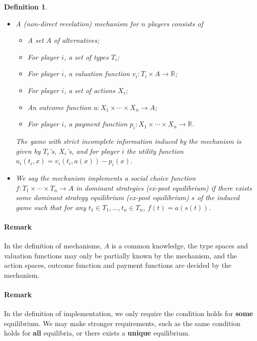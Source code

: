 \documentclass[openany]{book}
\newtheorem{definition}{Definition}[chapter]
\theoremstyle{remark}
\begin{document}
\begin{definition}$\ $
    \begin{itemize}
        \item A (non-direct revelation) mechanism for $n$ players consists of
        \begin{itemize}
            \item A set $A$ of alternatives;
            \item For player $i$, a set of types $T_i$;
            \item For player $i$, a valuation function $v_i:T_i\times A\to \mathbb{R}$;
            \item For player $i$, a set of actions $X_i$;
            \item An outcome function $a:X_1\times\cdots\times X_n\to A$;
            \item For player $i$, a payment function $p_i:X_1\times\cdots\times X_n\to \mathbb{R}$.
        \end{itemize}
        The game with strict incomplete information induced by the mechanism is given by $T_i$'s, $X_i$'s, and for player $i$ the utility function $u_i(t_i,x)=v_i(t_i,a(x))-p_i(x)$.
        \item We say the mechanism implements a social choice function $f:T_1\times\cdots\times T_n\to A$ in dominant strategies (ex-post equilibrium) if there exists some dominant strategy equilibrium (ex-post equilibrium) $s$ of the induced game such that for any $t_1\in T_1,\ldots,t_n\in T_n$, $f(t)=a(s(t))$.
    \end{itemize}
\end{definition}
\paragraph{Remark}
In the definition of mechanisms, $A$ is a common knowledge, the type spaces and valuation functions may only be partially known by the mechanism, and the action spaces, outcome function and payment functions are decided by the mechanism.

\paragraph{Remark}
In the definition of implementation, we only require the condition holds for \textbf{some} equilibrium. We may make stronger requirements, such as the same condition holds for \textbf{all} equilibria, or there exists a \textbf{unique} equilibrium. \\
\end{document}
